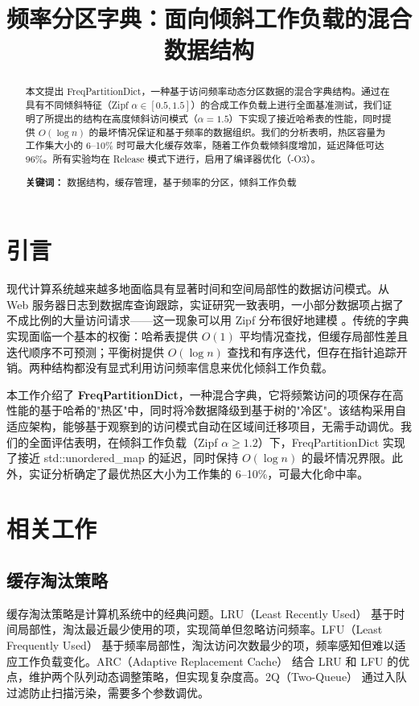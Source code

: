 \documentclass[11pt,a4paper]{article}
\title{\textbf{频率分区字典：面向倾斜工作负载的混合数据结构}}
\author{}
\date{}
\begin{document}
\maketitle

\begin{abstract}
本文提出 FreqPartitionDict，一种基于访问频率动态分区数据的混合字典结构。通过在具有不同倾斜特征（Zipf $\alpha \in [0.5, 1.5]$）的合成工作负载上进行全面基准测试，我们证明了所提出的结构在高度倾斜访问模式（$\alpha = 1.5$）下实现了接近哈希表的性能，同时提供 $O(\log n)$ 的最坏情况保证和基于频率的数据组织。我们的分析表明，热区容量为工作集大小的 6--10\% 时可最大化缓存效率，随着工作负载倾斜度增加，延迟降低可达 96\%。所有实验均在 Release 模式下进行，启用了编译器优化（-O3）。

\noindent\textbf{关键词：} 数据结构，缓存管理，基于频率的分区，倾斜工作负载
\end{abstract}

\section{引言}

现代计算系统越来越多地面临具有显著时间和空间局部性的数据访问模式。从 Web 服务器日志到数据库查询跟踪，实证研究一致表明，一小部分数据项占据了不成比例的大量访问请求——这一现象可以用 Zipf 分布很好地建模 \cite{zipf1949}。传统的字典实现面临一个基本的权衡：哈希表提供 $O(1)$ 平均情况查找，但缓存局部性差且迭代顺序不可预测；平衡树提供 $O(\log n)$ 查找和有序迭代，但存在指针追踪开销。两种结构都没有显式利用访问频率信息来优化倾斜工作负载。

本工作介绍了 \textbf{FreqPartitionDict}，一种混合字典，它将频繁访问的项保存在高性能的基于哈希的"热区"中，同时将冷数据降级到基于树的"冷区"。该结构采用自适应架构，能够基于观察到的访问模式自动在区域间迁移项目，无需手动调优。我们的全面评估表明，在倾斜工作负载（Zipf $\alpha \geq 1.2$）下，FreqPartitionDict 实现了接近 std::unordered\_map 的延迟，同时保持 $O(\log n)$ 的最坏情况界限。此外，实证分析确定了最优热区大小为工作集的 6--10\%，可最大化命中率。

\section{相关工作}

\subsection{缓存淘汰策略}

缓存淘汰策略是计算机系统中的经典问题。LRU（Least Recently Used）\cite{mattson1970} 基于时间局部性，淘汰最近最少使用的项，实现简单但忽略访问频率。LFU（Least Frequently Used）\cite{eleftheriou2006} 基于频率局部性，淘汰访问次数最少的项，频率感知但难以适应工作负载变化。ARC（Adaptive Replacement Cache）\cite{megiddo2003} 结合 LRU 和 LFU 的优点，维护两个队列动态调整策略，但实现复杂度高。2Q（Two-Queue）\cite{johnson1994} 通过入队过滤防止扫描污染，需要多个参数调优。
\end{document}

